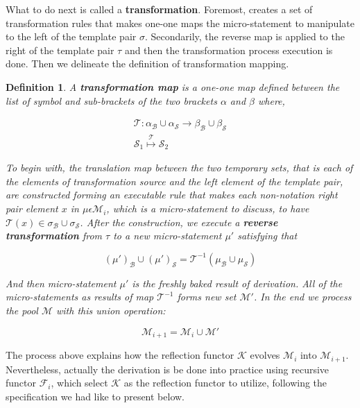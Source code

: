 \documentclass{aims}
\numberwithin{equation}{section}
\newtheorem{definition}{Definition}	%
\numberwithin{theorem}{section}	%
\numberwithin{axiom}{section}	%
\numberwithin{definition}{section}	%
\begin{document}
	What to do next is called a \textbf{ transformation}. Foremost, creates a set of transformation rules that makes one-one maps the micro-statement to manipulate to the left of the template pair \(\sigma\). Secondarily, the reverse map is applied to the right of the template pair \(\tau\) and then the transformation process execution is done. Then we delineate the definition of { }transformation mapping.
	
	\begin{definition}
		A \textbf{ transformation map} is a one-one map defined between the list of symbol and sub-brackets of the two brackets \(\alpha\) and \(\beta\) where,
		
		\begin{equation}
			\begin{gathered}
				\mathcal{T}:\alpha _{\mathcal{B}}\cup \alpha _{\mathcal{S}}\to \beta _{\mathcal{B}}\cup \beta _{\mathcal{S}}\\
				\mathcal{S}_1\overset{\mathcal{T}}{\mapsto }\mathcal{S}_2
			\end{gathered}
		\end{equation}
		
		To begin with, the translation map between the two temporary sets, that is each of the elements of transformation source and the left element of the template pair, are constructed forming an executable rule that makes each non-notation right pair element \(x\) in \(\mu \epsilon \mathcal{M}_i\), which is a micro-statement to discuss, to have \(\mathcal{T}(x)\in \sigma _{\mathcal{B}}\cup \sigma _{\mathcal{S}}\). After the construction, we execute a \textbf{ reverse transformation } from \(\tau\) to a new micro-statement \(\mu '\) satisfying that
		
		\begin{equation}
			(\mu ')_{\mathcal{B}}\cup (\mu ')_{\mathcal{S}} =\mathcal{T}^{-1}\left(\mu _{\mathcal{B}}\cup \mu _{\mathcal{S}}\right)
		\end{equation}
		
		And then micro-statement \(\mu '\) is the freshly baked result of derivation. All of the micro-statements as results of map \(\mathcal{T}^{-1}\) forms new set \(\mathcal{M}'\). In the end we process the pool \(\mathcal{M}\) with this union operation:
		
		\[\mathcal{M}_{i+1}=\mathcal{M}_i\cup \mathcal{M}'\]
	\end{definition}
	
	The process above explains how the reflection functor \(\mathcal{K}\) evolves \(\mathcal{M}_i\) into \(\mathcal{M}_{i+1}\). Nevertheless, actually the derivation is be done into practice using recursive functor \(\mathcal{F}_i\), which select \(\mathcal{K}\) as the reflection functor to utilize, following the specification we had like to present below.
	
\end{document}

